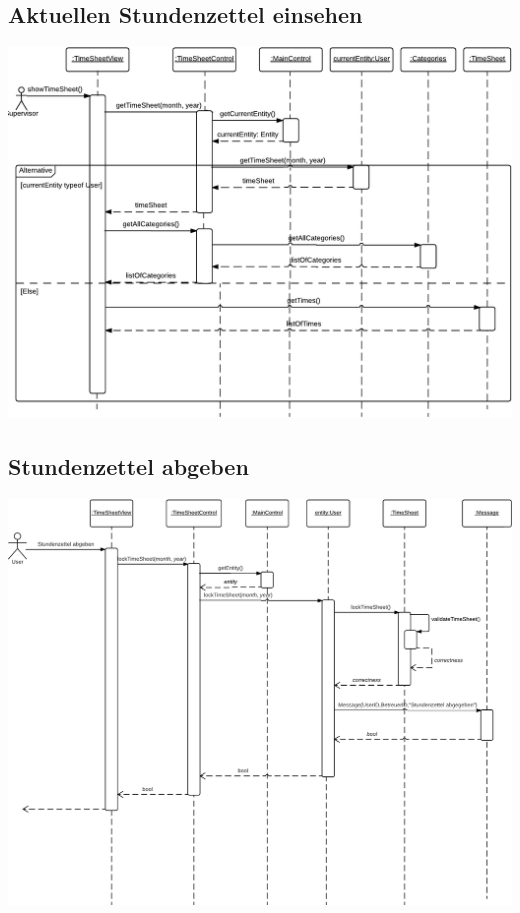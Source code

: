     \newpage
    \subsection{Aktuellen Stundenzettel einsehen}

        \includegraphics[width=\linewidth]{Diagramms/sequenzes/current_timesheet.pdf}

    \newpage
    \subsection{Stundenzettel abgeben}

        \includegraphics[width=\linewidth]{Diagramms/sequenzes/send_in_timesheet.pdf}

